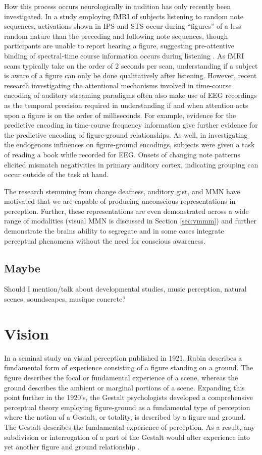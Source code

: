 How this process occurs neurologically in audition has only recently been investigated. In a study employing fMRI of subjects listening to random note sequences, activations shown in IPS and STS occur during ``figures'' of a less random nature than the preceding and following note sequences, though participants are unable to report hearing a figure, suggesting pre-attentive binding of spectral-time course information occurs during listening \cite{Teki2011a}. As fMRI scans typically take on the order of 2 seconds per scan, understanding if a subject is aware of a figure can only be done qualitatively after listening.  However, recent research investigating the attentional mechanisms involved in time-course encoding of auditory streaming paradigms often also make use of EEG recordings as the temporal precision required in understanding if and when attention acts upon a figure is on the order of milliseconds.  For example, evidence for the predictive encoding in time-course frequency information \cite{Winkler2009} give further evidence for the predictive encoding of figure-ground relationships.  As well, in investigating the endogenous influences on figure-ground encodings, subjects were given a task of reading a book while recorded for EEG.  Onsets of changing note patterns elicited mismatch negativities in primary auditory cortex, indicating grouping can occur outside of the task at hand.

The research stemming from change deafness, auditory gist, and MMN have motivated that we are capable of producing unconscious representations in perception.  Further, these representations are even demonstrated across a wide range of modalities (visual MMN is discussed in Section \ref{sec:vmmm}) and further demonstrate the brains ability to segregate and in some cases integrate perceptual phenomena without the need for conscious awareness.  

\subsection{Maybe}

Should I mention/talk about developmental studies, music perception, natural scenes, soundscapes, musique concrete?

\section{Vision}

In a seminal study on visual perception published in 1921, Rubin describes a fundamental form of experience consisting of a figure standing on a ground.  The figure describes the focal or fundamental experience of a scene, whereas the ground describes the ambient or marginal portions of a scene.  Expanding this point further in the 1920's, the Gestalt psychologists developed a comprehensive perceptual theory employing figure-ground as a fundamental type of perception where the notion of a Gestalt, or totality, is described by a figure and ground.  The Gestalt describes the fundamental experience of perception.  As a result, any subdivision or interrogation of a part of the Gestalt would alter experience into yet another figure and ground relationship \cite{Wever1927}.  

